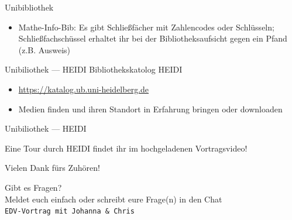 \begin{frame}{Unibibliothek}
{\begin{itemize}
\begin{itemize}
                    \item Mathe-Info-Bib: Es gibt Schließfächer mit Zahlencodes oder Schlüsseln; Schließfachschüssel erhaltet ihr bei der Bibliotheksaufsicht gegen ein Pfand (z.B. Ausweis)
                \end{itemize}
        \end{itemize}
    }
\end{frame}

\begin{frame}{Unibiliothek --- HEIDI}
    Bibliothekskatolog HEIDI
    \begin{itemize}
        \item \url{https://katalog.ub.uni-heidelberg.de}
        \item Medien finden und ihren Standort in Erfahrung bringen oder downloaden
    \end{itemize}
\end{frame}

\begin{frame}{Unibiliothek --- HEIDI}
    \vspace{6em}
    \begin{center}
        \Large Eine Tour durch HEIDI findet ihr im hochgeladenen Vortragsvideo!
    \end{center}
\end{frame}

\begin{frame}{Vielen Dank fürs Zuhören!}
    \vfill
    \begin{center}
        \Huge Gibt es Fragen? \\[12pt]
        \large Meldet euch einfach oder schreibt eure Frage(n) in den Chat \\[20pt]
        \normalsize \texttt{EDV-Vortrag mit Johanna \& Chris}
    \end{center}
\end{frame}


